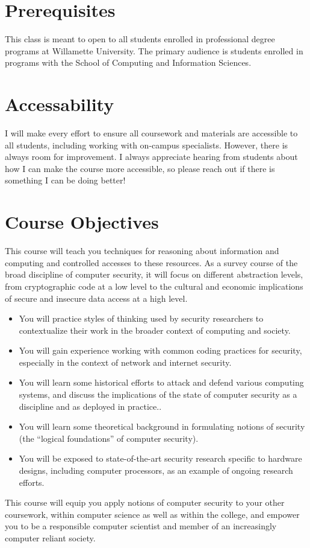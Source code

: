 \documentclass[11pt]{article}
\begin{document}
\section*{Prerequisites}

This class is meant to open to all students enrolled in professional degree programs at Willamette University. The primary audience is students enrolled in programs with the School of Computing and Information Sciences.

\section*{Accessability}

I will make every effort to ensure all coursework and materials are accessible to all students, including working with on-campus specialists. However, there is always room for improvement. I always appreciate hearing from students about how I can make the course more accessible, so please reach out if there is something I can be doing better!


\section*{Course Objectives}
This course will teach you techniques for reasoning about information and computing and controlled accesses to these resources. As a survey course of the broad discipline of computer security, it will focus on different abstraction levels, from cryptographic code at a low level to the cultural and economic implications of secure and insecure data access at a high level.
\begin{itemize}
\item You will practice styles of thinking used by security researchers to contextualize their work in the broader context of computing and society.
\item You will gain experience working with common coding practices for security, especially in the context of network and internet security.
\item You will learn some historical efforts to attack and defend various computing systems, and discuss the implications of the state of computer security as a discipline and as deployed in practice..
\item You will learn some theoretical background in formulating notions of security (the ``logical foundations'' of computer security).
\item You will be exposed to state-of-the-art security research specific to hardware designs, including computer processors, as an example of ongoing research efforts.
\end{itemize}
This course will equip you apply notions of computer security to your other coursework, within computer science as well as within the college, and empower you to be a responsible computer scientist and member of an increasingly computer reliant society.
\end{document}
